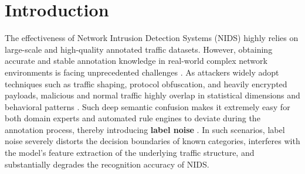 \documentclass{SCIS2026}
\begin{document}

\maketitle


\section{Introduction}\label{Introduction}

The effectiveness of Network Intrusion Detection Systems (NIDS) highly relies on large-scale and high-quality annotated traffic datasets. However, obtaining accurate and stable annotation knowledge in real-world complex network environments is facing unprecedented challenges \cite{guerra2022datasets}. As attackers widely adopt techniques such as traffic shaping, protocol obfuscation, and heavily encrypted payloads, malicious and normal traffic highly overlap in statistical dimensions and behavioral patterns \cite{EC-Net}. Such deep semantic confusion makes it extremely easy for both domain experts and automated rule engines to deviate during the annotation process, thereby introducing \textbf{label noise} \cite{kim2022human, FlowRefiner}. In such scenarios, label noise severely distorts the decision boundaries of known categories, interferes with the model's feature extraction of the underlying traffic structure, and substantially degrades the recognition accuracy of NIDS.
\end{document}
